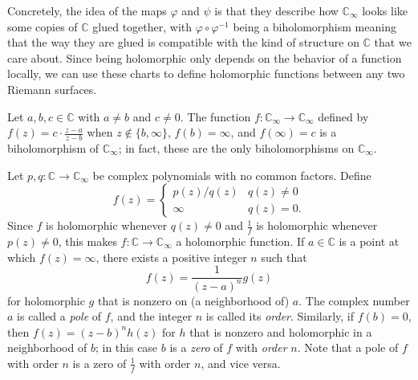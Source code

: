 \documentclass[10pt]{article}
\providecommand{\CC}{\mathbb C}
\providecommand{\inv}{^{-1}}
\providecommand{\vocab}[1]{{{\sffamily\textit{#1}}}}
\begin{document}
Concretely, the idea of the maps $\varphi$ and $\psi$ is that
they describe how $\CC_\infty$ looks like some copies of $\CC$ glued together,
with $\varphi\circ\varphi\inv$ being a biholomorphism meaning
that the way they are glued is compatible with the kind of
structure on $\CC$ that we care about.
Since being holomorphic only depends on the behavior of a function locally,
we can use these charts to define holomorphic functions
between any two Riemann surfaces.



\begin{example}
    Let $a,b,c\in\CC$ with $a\ne b$ and $c\ne 0$.
    The function $f\colon\CC_\infty\to\CC_\infty$
    defined by $f(z) = c\cdot\frac{z-a}{z-b}$
    when $z\notin\{b,\infty\}$, $f(b) = \infty$, and $f(\infty) = c$
    is a biholomorphism of $\CC_\infty$;
    in fact, these are the only biholomorphisms on $\CC_\infty$.
\end{example}

\begin{example}
    Let $p,q\colon\CC\to\CC_\infty$ be complex polynomials
    with no common factors. Define
    \begin{equation*}
        f(z) = \begin{cases}
	    p(z)/q(z) & q(z)\ne 0\\
	    \infty & q(z) = 0.
        \end{cases}
    \end{equation*}
    Since $f$ is holomorphic whenever $q(z)\ne 0$
    and $\frac 1f$ is holomorphic whenever $p(z)\ne 0$,
    this makes $f\colon\CC\to\CC_\infty$ a holomorphic function.
    If $a\in\CC$ is a point at which $f(z) = \infty$,
    there exists a positive integer $n$ such that
    \begin{equation*}
	f(z) = \frac{1}{(z-a)^n}g(z)
    \end{equation*}
    for holomorphic $g$ that is nonzero on (a neighborhood of) $a$.
    The complex number $a$ is called a \vocab{pole} of $f$,
    and the integer $n$ is called its \vocab{order}.
    Similarly, if $f(b) = 0$, then
    $f(z) = (z-b)^nh(z)$ for $h$ that is nonzero and holomorphic
    in a neighborhood of $b$; in this case $b$ is a \vocab{zero} of $f$
    with \vocab{order} $n$.
    Note that a pole of $f$ with order $n$ is a zero of $\frac 1f$
    with order $n$, and vice versa.
\end{example}
\end{document}
